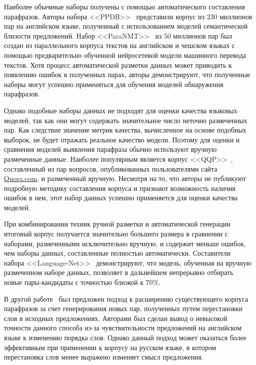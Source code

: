 \documentclass[a4paper,14pt]{extarticle}
\begin{document}
Наиболее объемные наборы получены с помощью автоматического составления парафразов.
Авторы набора \mbox{<<PPDB>>}~\autocite{ganitkevitch2013ppdb} представили корпус из $230$ миллионов пар на английском языке, полученный с использованием моделей семантической близости предложений.
Набор \mbox{<<ParaNMT>>}~\autocite{wieting2017paranmt} из $50$ миллионов пар был создан из параллельного корпуса текстов на английском и чешском языках с помощью предварительно обученной нейросетевой модели машинного перевода текстов.
Хотя процесс автоматической разметки данных может приводить к появлению ошибок в полученных парах, авторы демонстрируют, что полученные наборы могут успешно применяться для обучения моделей обнаружения парафразов.

Однако подобные наборы данных не подходят для оценки качества языковых моделей, так как они могут содержать значительное число неточно размеченных пар.
Как следствие значение метрик качества, вычисленное на основе подобных выборок, не будет отражать реальное качество модели.
Поэтому для оценки и сравнения моделей выявления парафраза обычно используют вручную размеченные данные.
Наиболее популярным является корпус \mbox{<<QQP>>}~\autocite{iyer_csernai_dandekar_2017}, составленный из пар вопросов, опубликованных пользователями сайта \href{https://www.quora.com/}{\mbox{Quora.com}}, и размеченный вручную.
Несмотря на то, что авторы не публикуют подробную методику составления корпуса и признают возможность наличия ошибок в нем, этот набор данных успешно применяется для оценки качества моделей.

При комбинировании техник ручной разметки и автоматической генерации итоговый корпус получается значительно большего размера в сравнении с наборами, размеченными исключительно вручную, и содержит меньше ошибок, чем наборы данных, составленные полностью автоматически.
Составители набора \mbox{<<Language-Net>>}~\autocite{lan-etal-2017-continuously} демонстрируют, что модель, обученная на вручную размеченном наборе данных, позволяет в дальнейшем непрерывно отбирать новые пары-кандидаты с точностью близкой к $70\%$.

В другой работе~\autocite{zhang2019paws} был предложен подход к расширению существующего корпуса парафразов за счет генерирования новых пар, полученных путем перестановки слов в исходных предложениях.
Авторами был сделан вывод о невысокой точности данного способа из-за чувствительности предложений на английском языке к изменению порядка слов.
Однако данный подход может оказаться более эффективным при применении к корпусу на русском языке, в котором перестановка слов менее выражено изменяет смысл предложения.
\end{document}
